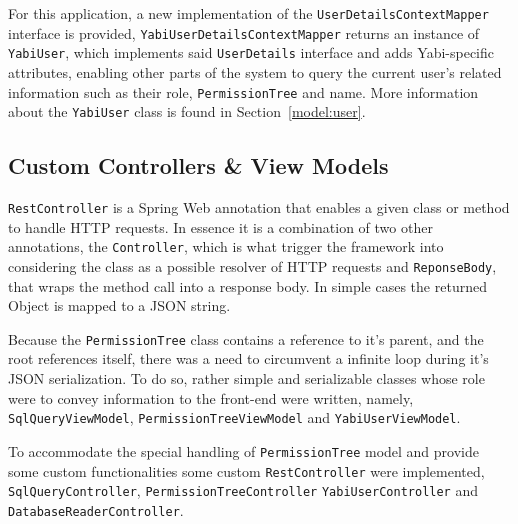 For this application, a new implementation of the \texttt{UserDetailsContextMapper} interface is provided, \texttt{YabiUserDetailsContextMapper} returns an instance of \texttt{YabiUser}, which implements said \texttt{UserDetails} interface and adds \gls{Yabi}-specific attributes, enabling other parts of the system to query the current user's related information such as their role, \texttt{PermissionTree} and name. More information about the \texttt{YabiUser} class is found in Section~\ref{model:user}.

\subsection{Custom Controllers \& View Models}
\texttt{RestController} is a Spring Web annotation that enables a given class or method to handle \gls{HTTP} requests. In essence it is a combination of two other annotations, the \texttt{Controller}, which is what trigger the framework into considering the class as a possible resolver of  \gls{HTTP} requests and \texttt{ReponseBody}, that wraps the method call into a response body. In simple cases the returned Object is mapped to a \gls{JSON} string.

Because the \texttt{PermissionTree} class contains a reference to it's parent, and the root references itself, there was a need to circumvent a infinite loop during it's \gls{JSON} serialization. To do so, rather simple and 
serializable classes whose role were to convey information to the front-end were written, namely, \texttt{SqlQueryViewModel}, \texttt{PermissionTreeViewModel} and \texttt{YabiUserViewModel}.

To accommodate the special handling of \texttt{PermissionTree} model and provide some custom functionalities some custom \texttt{RestController} were implemented, \texttt{SqlQueryController}, \texttt{PermissionTreeController} \texttt{YabiUserController} and \texttt{DatabaseReaderController}.



